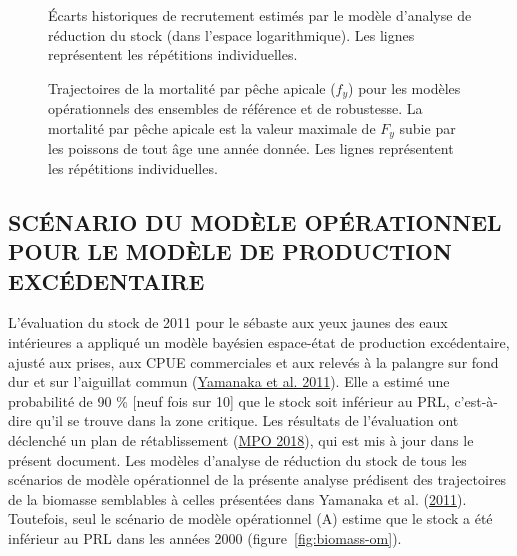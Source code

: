 \documentclass[french,11pt]{book}
\begin{document}
\begin{figure}[htb]

{\centering {} 

}

\caption{Écarts historiques de recrutement estimés par le modèle d'analyse de réduction du stock (dans l'espace logarithmique). Les lignes représentent les répétitions individuelles.}\label{fig:recdev-om}
\end{figure}

\begin{figure}[htb]

{\centering {} 

}

\caption{Trajectoires de la mortalité par pêche apicale (\(f_y\)) pour les modèles opérationnels des ensembles de référence et de robustesse. La mortalité par pêche apicale est la valeur maximale de \(F_y\) subie par les poissons de tout âge une année donnée. Les lignes représentent les répétitions individuelles.}\label{fig:F-om}
\end{figure}
\clearpage

\hypertarget{scuxe9nario-du-moduxe8le-opuxe9rationnel-pour-le-moduxe8le-de-production-excuxe9dentaire}{%
\subsection{SCÉNARIO DU MODÈLE OPÉRATIONNEL POUR LE MODÈLE DE PRODUCTION EXCÉDENTAIRE}\label{scuxe9nario-du-moduxe8le-opuxe9rationnel-pour-le-moduxe8le-de-production-excuxe9dentaire}}

L'évaluation du stock de 2011 pour le sébaste aux yeux jaunes des eaux intérieures a appliqué un modèle bayésien espace-état de production excédentaire, ajusté aux prises, aux CPUE commerciales et aux relevés à la palangre sur fond dur et sur l'aiguillat commun (\protect\hyperlink{ref-yamanaka2011}{Yamanaka et al. 2011}). Elle a estimé une probabilité de 90 \% {[}neuf fois sur 10{]} que le stock soit inférieur au PRL, c'est-à-dire qu'il se trouve dans la zone critique. Les résultats de l'évaluation ont déclenché un plan de rétablissement (\protect\hyperlink{ref-ifmp2018}{MPO 2018}), qui est mis à jour dans le présent document. Les modèles d'analyse de réduction du stock de tous les scénarios de modèle opérationnel de la présente analyse prédisent des trajectoires de la biomasse semblables à celles présentées dans Yamanaka et al. (\protect\hyperlink{ref-yamanaka2011}{2011}). Toutefois, seul le scénario de modèle opérationnel (A) estime que le stock a été inférieur au PRL dans les années 2000 (figure~\ref{fig:biomass-om}).
\end{document}
